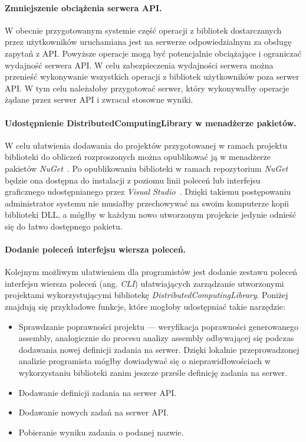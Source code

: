 \documentclass[a4paper,11pt,twoside]{report}
\theoremstyle{definition}
\begin{document}
        \paragraph{Zmniejszenie obciążenia serwera API.}
        W obecnie przygotowanym systemie część operacji z bibliotek dostarczanych przez użytkowników uruchamiana jest na serwerze odpowiedzialnym za obsługę zapytań z API. Powyższe operacje mogą być potencjalnie obciążające i ograniczać wydajność serwera API. W celu zabezpieczenia wydajności serwera można przenieść wykonywanie wszystkich operacji z bibliotek użytkowników poza serwer API. W tym celu należałoby przygotować serwer, który wykonywałby operacje żądane przez serwer API i zwracał stosowne wyniki.
        
        \paragraph{Udostępnienie DistributedComputingLibrary w menadżerze pakietów.}
        W celu ułatwienia dodawania do projektów przygotowanej w ramach projektu biblioteki do obliczeń rozproszonych można opublikować ją w menadżerze pakietów \textit{NuGet}~\cite{nuget}. Po opublikowaniu biblioteki w ramach repozytorium \textit{NuGet} będzie ona dostępna do instalacji z poziomu linii poleceń lub interfejsu graficznego udostępnianego przez \textit{Visual Studio}~\cite{visual-studio}. Dzięki takiemu postępowaniu administrator systemu nie musiałby przechowywać na swoim komputerze kopii biblioteki DLL, a mógłby w każdym nowo utworzonym projekcie jedynie odnieść się do łatwo dostępnego pakietu.
        
        \paragraph{Dodanie poleceń interfejsu wiersza poleceń.}
        Kolejnym możliwym ułatwieniem dla programistów jest dodanie zestawu poleceń interfejsu wiersza poleceń (ang. \textit{CLI}) ułatwiających zarządzanie utworzonymi projektami wykorzystującymi bibliotekę \textit{DistributedComputingLibrary}. Poniżej znajdują się przykładowe funkcje, które mogłoby udostępniać takie narzędzie:
        
        \begin{itemize}
            \item Sprawdzanie poprawności projektu --- weryfikacja poprawności generowanego assembly, analogicznie do procesu analizy assembly odbywającej się podczas dodawania nowej definicji zadania na serwer. Dzięki lokalnie przeprowadzonej analizie programista mógłby dowiadywać się o nieprawidłowościach w wykorzystaniu biblioteki zanim jeszcze prześle definicję zadania na serwer.
            \item Dodawanie definicji zadania na serwer API.
            \item Dodawanie nowych zadań na serwer API.
            \item Pobieranie wyniku zadania o podanej nazwie.
        \end{itemize}
        
\end{document}
